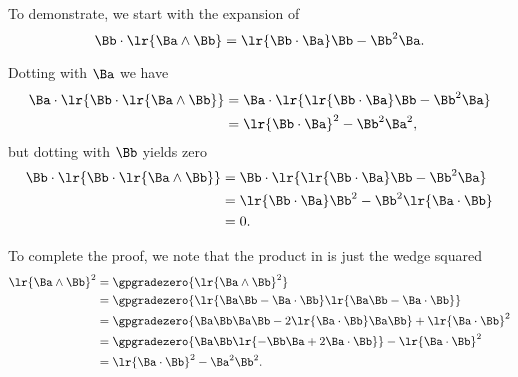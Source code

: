 To demonstrate, we start with the expansion of
\begin{equation}\label{eqn:stokesTheoremGeometricAlgebra:3280}
\Bb \cdot \lr{ \Ba \wedge \Bb }
=
\lr{ \Bb \cdot \Ba } \Bb
-\Bb^2 \Ba.
\end{equation}

Dotting with \(\Ba\) we have
\begin{equation}\label{eqn:stokesTheoremGeometricAlgebra:3300}
\begin{aligned}
\Ba \cdot \lr{ \Bb \cdot \lr{ \Ba \wedge \Bb } }
&=
\Ba \cdot \lr{
\lr{ \Bb \cdot \Ba } \Bb
-\Bb^2 \Ba
} \\
&=
\lr{ \Bb \cdot \Ba }^2 - \Bb^2 \Ba^2,
\end{aligned}
\end{equation}
but dotting with \(\Bb\) yields zero
\begin{equation}\label{eqn:stokesTheoremGeometricAlgebra:3320}
\begin{aligned}
\Bb \cdot \lr{ \Bb \cdot \lr{ \Ba \wedge \Bb } }
&=
\Bb \cdot \lr{
\lr{ \Bb \cdot \Ba } \Bb
-\Bb^2 \Ba
} \\
&=
\lr{ \Bb \cdot \Ba } \Bb^2 - \Bb^2 \lr{ \Ba \cdot \Bb } \\
&= 0.
\end{aligned}
\end{equation}

To complete the proof, we note that the product in  is just the wedge squared
\begin{equation}\label{eqn:stokesTheoremGeometricAlgebra:3340}
\begin{aligned}
\lr{ \Ba \wedge \Bb}^2
&=
\gpgradezero{
\lr{ \Ba \wedge \Bb }^2
} \\
&=
\gpgradezero{
\lr{ \Ba \Bb - \Ba \cdot \Bb }
\lr{ \Ba \Bb - \Ba \cdot \Bb }
} \\
&=
\gpgradezero{
\Ba \Bb \Ba \Bb - 2 \lr{\Ba \cdot \Bb} \Ba \Bb
}
+
\lr{ \Ba \cdot \Bb }^2 \\
&=
\gpgradezero{
\Ba \Bb \lr{ -\Bb \Ba + 2 \Ba \cdot \Bb }
}
-
\lr{ \Ba \cdot \Bb }^2 \\
&=
\lr{ \Ba \cdot \Bb }^2
-\Ba^2 \Bb^2.
\end{aligned}
\end{equation}

